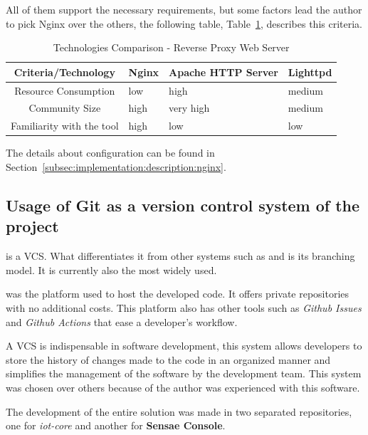 All of them support the necessary requirements, but some factors lead the author to pick Nginx over the others, the following table, Table~\ref{tab:implementation:decisions:nginx:compare}, describes this criteria.

\begin{table}[H]
    \caption{Technologies Comparison - Reverse Proxy Web Server}
    \label{tab:implementation:decisions:nginx:compare}
    \centering
    \begin{tabular}{@{}clll@{}}
    \toprule
    \textbf{Criteria/Technology} & \textbf{Nginx} & \textbf{Apache HTTP Server} & \textbf{Lighttpd} \\ \midrule
    Resource Consumption      & low  & high      & medium \\ \midrule
    Community Size            & high & very high & medium \\ \midrule
    Familiarity with the tool & high & low       & low    \\ \bottomrule
    \end{tabular}
\end{table}

The details about  configuration can be found in Section~\ref{subsec:implementation:description:nginx}.

\subsection{Usage of Git as a version control system of the project}
\label{subsec:implementation:decisions:git}

 is a \gls{VCS}. What differentiates it from other
systems such as  and  is its branching model. It is currently also the most widely used.

 was the platform used to host the developed code. It offers private repositories with no additional costs. This platform also has other tools such as \textit{Github Issues} and \textit{Github Actions} that ease a developer's workflow. 

A \gls{VCS} is indispensable in software development, this system allows developers to store the history of changes made to the code in an organized manner and simplifies the management of the software by the development team. This system was chosen over others because of the author was experienced with this software.

The development of the entire solution was made in two separated repositories, one for \textit{iot-core} and another for \textbf{Sensae Console}.

